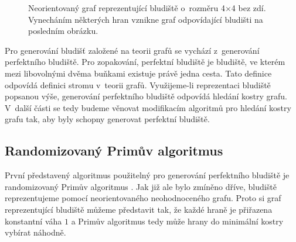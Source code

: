 \documentclass[a4paper,12pt]{article}
\begin{document}
\begin{figure}[h]
  \begin{center}
  \end{center}
  \caption{Neorientovaný graf reprezentující bludiště o~rozměru 4$\times$4 bez zdí. Vynecháním některých hran vznikne 
  graf odpovídající bludišti na posledním obrázku.}
  \label{fig:mazeReprezentation}
\end{figure}

Pro generování bludišť založené na teorii grafů se vychází z~generování perfektního bludiště. Pro zopakování, perfektní bludiště je 
bludiště, ve kterém mezi libovolnými dvěma buňkami existuje právě jedna cesta. Tato definice odpovídá definici stromu v~teorii grafů.
Využijeme-li reprezentaci bludiště popsanou výše, generování perfektního bludiště odpovídá hledání kostry grafu. V~další části se 
tedy budeme věnovat modifikacím algoritmů pro hledání kostry grafu tak, aby byly schopny generovat perfektní bludiště.

\subsection{Randomizovaný Primův algoritmus}
První představený algoritmus použitelný pro generování perfektního bludiště je randomizovaný Primův algoritmus \cite{fol}. Jak již ale bylo zmíněno dříve,
bludiště reprezentujeme pomocí neorientovaného neohodnoceného grafu. Proto si graf reprezentující bludiště můžeme představit tak, že každé hraně je přiřazena 
konstantní váha $1$ a Primův algoritmus tedy může hrany do minimální kostry vybírat náhodně.
\end{document}
